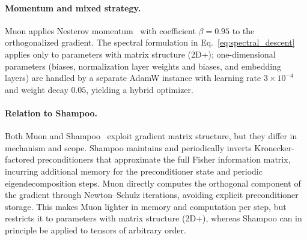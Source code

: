 \paragraph{Momentum and mixed strategy.}
Muon applies Nesterov momentum~\cite{sutskever2013importance} with coefficient $\beta = 0.95$ to the orthogonalized gradient.
The spectral formulation in Eq.~\eqref{eq:spectral_descent} applies only to parameters with matrix structure (2D+); one-dimensional parameters (biases, normalization layer weights and biases, and embedding layers) are handled by a separate AdamW instance with learning rate $3 \times 10^{-4}$ and weight decay $0.05$, yielding a hybrid optimizer.

\paragraph{Relation to Shampoo.}
Both Muon and Shampoo~\cite{gupta2018shampoo} exploit gradient matrix structure, but they differ in mechanism and scope.
Shampoo maintains and periodically inverts Kronecker-factored preconditioners that approximate the full Fisher information matrix, incurring additional memory for the preconditioner state and periodic eigendecomposition steps.
Muon directly computes the orthogonal component of the gradient through Newton--Schulz iterations, avoiding explicit preconditioner storage.
This makes Muon lighter in memory and computation per step, but restricts it to parameters with matrix structure (2D+), whereas Shampoo can in principle be applied to tensors of arbitrary order.
